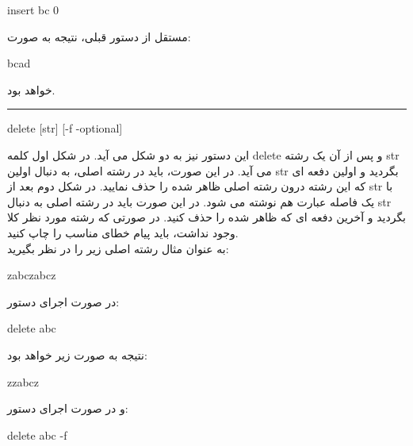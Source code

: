 \documentclass[]{article}
\begin{document}
\begin{tcolorbox}[boxrule=0pt]
	\begin{latin}
  	  \large{
  	  	insert bc 0
		}
	\end{latin}
\end{tcolorbox}
مستقل از دستور قبلی، نتیجه به صورت:
\begin{tcolorbox}[boxrule=0pt]
	\begin{latin}
  	  \large{
  	  	bcad
		}
	\end{latin}
\end{tcolorbox}
خواهد بود.\\
\noindent\rule[0.5ex]{\linewidth}{1pt}
\begin{tcolorbox}[boxrule=0pt]
	\begin{latin}
  	  \large{
  	  	delete [str] [-f -optional]
		}
	\end{latin}
\end{tcolorbox}
این دستور نیز به دو شکل می آید. در شکل اول کلمه delete و پس از آن یک رشته str می آید. در این صورت، باید در رشته اصلی، به دنبال اولین str بگردید و اولین دفعه ای که این رشته درون رشته اصلی ظاهر شده را حذف نمایید. در شکل دوم بعد از str با یک فاصله عبارت 
 هم نوشته می شود. در این صورت باید در رشته اصلی به دنبال str بگردید و آخرین دفعه ای که ظاهر شده را حذف کنید. در صورتی که رشته مورد نظر کلا وجود نداشت، باید پیام خطای مناسب را چاپ کنید.\\
به عنوان مثال رشته اصلی زیر را در نظر بگیرید:\\
\begin{tcolorbox}[boxrule=0pt]
	\begin{latin}
  	  \large{
		zabczabcz
		}
	\end{latin}
\end{tcolorbox}
در صورت اجرای دستور:
\begin{tcolorbox}[boxrule=0pt]
	\begin{latin}
  	  \large{
  	  	delete abc
		}
	\end{latin}
\end{tcolorbox}
نتیجه به صورت زیر خواهد بود:
\begin{tcolorbox}[boxrule=0pt]
	\begin{latin}
  	  \large{
  	  	zzabcz
		}
	\end{latin}
\end{tcolorbox}
و در صورت اجرای دستور:
\begin{tcolorbox}[boxrule=0pt]
	\begin{latin}
  	  \large{
  	  	delete abc -f
		}
	\end{latin}
\end{tcolorbox}
\end{document}
